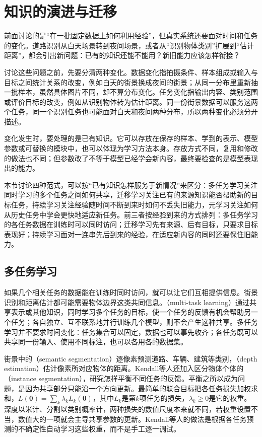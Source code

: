 \section{知识的演进与迁移}
\label{sec:knowledge-evolution-and-transfer-overview}

前面讨论的是“在一批固定数据上如何利用经验”，但真实系统还要面对时间和任务的变化。道路识别从白天场景转到夜间场景，或者从“识别物体类别”扩展到“估计距离”，都会引出新问题：已有的知识还能不能用？新旧能力应该怎样衔接？

讨论这些问题之前，先要分清两种变化。数据变化指拍摄条件、样本组成或输入与目标之间统计关系的改变，例如白天的街景换成夜间的街景；从同一分布里重新抽一批样本，虽然具体图片不同，却不算分布变化。任务变化指输出内容、类别范围或评价目标的改变，例如从识别物体转为估计距离。同一份街景数据可以服务这两个任务，同一个识别任务也可能面对白天和夜间两种分布，所以两种变化必须分开描述。

变化发生时，要处理的是已有知识。它可以存放在保存的样本、学到的表示、模型参数或可替换的模块中，也可以体现为学习方法本身。存放方式不同，复用和修改的做法也不同；但参数改了不等于模型已经学会新内容，最终要检查的是模型表现出的能力。

本节讨论四种范式，可以按“已有知识怎样服务于新情况”来区分：多任务学习关注同时学习的多个任务之间如何共享，迁移学习关注已有的来源知识能否帮助新的目标任务，持续学习关注经验随时间不断到来时如何不丢失旧能力，元学习关注如何从历史任务中学会更快地适应新任务。前三者按经验到来的方式排列：多任务学习的各任务数据在训练时可以同时访问；迁移学习先有来源、后有目标，只要求目标表现好；持续学习面对一连串先后到来的经验，在适应新内容的同时还要保住旧能力。

\subsection{多任务学习}
\label{sec:multi-task-learning}

如果几个相关任务的数据能在训练时同时访问，就可以让它们互相提供信息。街景识别和距离估计都可能需要物体边界这类共同信息。（multi-task learning）通过共享表示或其他知识，同时学习多个任务的目标，使一个任务的反馈有机会帮助另一个任务；各自独立、互不联系地并行训练几个模型，则不会产生这种共享。多任务学习并不要求时间变化：任务集合可以固定，数据也可以事先收齐；各任务既可以共享同一份输入、使用不同标注，也可以各用各的数据集。

街景中的（semantic segmentation）逐像素预测道路、车辆、建筑等类别，（depth estimation）估计像素所对应物体的距离。Kendall等人还加入区分物体个体的（instance segmentation），研究怎样平衡不同任务的反馈。平衡之所以成为问题，是因为共享部分只能沿一个方向更新。最简单的联合目标把各任务损失加权求和，$L(\bm{\theta})=\sum_{k}\lambda_kL_k(\bm{\theta})$，其中$L_k$是第$k$项任务的损失，$\lambda_k\geq 0$是它的权重。深度以米计、分割以类别概率计，两种损失的数值尺度本来就不同，若权重设置不当，数值大的一项就会主导共享参数的更新。Kendall等人的做法是根据各任务预测的不确定性自动学习这些权重，而不是手工逐一调试。

